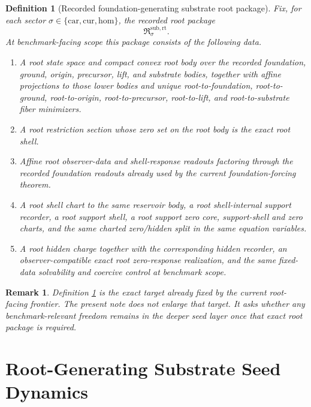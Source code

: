 \documentclass[11pt]{article}
\newcommand{\Car}{\mathrm{car}}
\newcommand{\Cur}{\mathrm{cur}}
\newcommand{\Hom}{\mathrm{hom}}
\newcommand{\RootPackage}{\mathfrak R^{\mathrm{sub,rt}}}
\newtheorem{definition}{Definition}
\newtheorem{remark}{Remark}
\begin{document}
\begin{definition}[Recorded foundation-generating substrate root package]
\label{def:root}
Fix, for each sector \(\sigma\in\{\Car,\Cur,\Hom\}\), the recorded root package
\[
\RootPackage_{\sigma}.
\]
At benchmark-facing scope this package consists of the following data.
\begin{enumerate}
    \item A root state space and compact convex root body over the recorded foundation, ground, origin, precursor, lift, and substrate bodies, together with affine projections to those lower bodies and unique root-to-foundation, root-to-ground, root-to-origin, root-to-precursor, root-to-lift, and root-to-substrate fiber minimizers.
    \item A root restriction section whose zero set on the root body is the exact root shell.
    \item Affine root observer-data and shell-response readouts factoring through the recorded foundation readouts already used by the current foundation-forcing theorem.
    \item A root shell chart to the same reservoir body, a root shell-internal support recorder, a root support shell, a root support zero core, support-shell and zero charts, and the same charted zero/hidden split in the same equation variables.
    \item A root hidden charge together with the corresponding hidden recorder, an observer-compatible exact root zero-response realization, and the same fixed-data solvability and coercive control at benchmark scope.
\end{enumerate}
\end{definition}

\begin{remark}
Definition \ref{def:root} is the exact target already fixed by the current root-facing frontier. The present note does not enlarge that target. It asks whether any benchmark-relevant freedom remains in the deeper seed layer once that exact root package is required.
\end{remark}

\section{Root-Generating Substrate Seed Dynamics}
\end{document}
